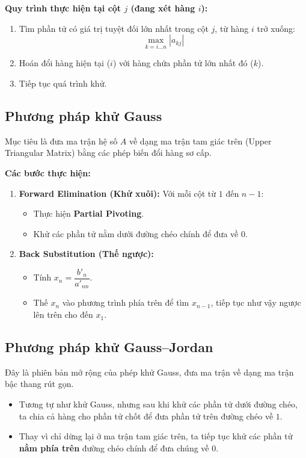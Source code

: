 \documentclass[a4paper,12pt]{report}
\begin{document}
\textbf{Quy trình thực hiện tại cột $j$ (đang xét hàng $i$):}
\begin{enumerate}
    \item Tìm phần tử có giá trị tuyệt đối lớn nhất trong cột $j$, từ hàng $i$ trở xuống:
    \[
    \max_{k=i \dots n} |a_{kj}|
    \]
    \item Hoán đổi hàng hiện tại ($i$) với hàng chứa phần tử lớn nhất đó ($k$).
    \item Tiếp tục quá trình khử.
\end{enumerate}

\subsection{Phương pháp khử Gauss}

Mục tiêu là đưa ma trận hệ số $A$ về dạng ma trận tam giác trên (Upper Triangular Matrix) bằng các phép biến đổi hàng sơ cấp.

\vspace*{0.1cm}
\textbf{Các bước thực hiện:}
\begin{enumerate}
    \item \textbf{Forward Elimination (Khử xuôi):}
    Với mỗi cột từ $1$ đến $n-1$:
    \begin{itemize}
        \item Thực hiện \textbf{Partial Pivoting}.
        \item Khử các phần tử nằm dưới đường chéo chính để đưa về $0$.
    \end{itemize}
    \item \textbf{Back Substitution (Thế ngược):}
    \begin{itemize}
        \item Tính $x_n = \dfrac{b'_n}{a'_{nn}}$.
        \item Thế $x_n$ vào phương trình phía trên để tìm $x_{n-1}$, tiếp tục như vậy ngược lên trên cho đến $x_1$.
    \end{itemize}
\end{enumerate}

\subsection{Phương pháp khử Gauss--Jordan}
Đây là phiên bản mở rộng của phép khử Gauss, đưa ma trận về dạng ma trận bậc thang rút gọn.

\begin{itemize}
    \item Tương tự như khử Gauss, nhưng sau khi khử các phần tử dưới đường chéo, ta chia cả hàng cho phần tử chốt để đưa phần tử trên đường chéo về $1$.
    
    \item Thay vì chỉ dừng lại ở ma trận tam giác trên, ta tiếp tục khử các phần tử \textbf{nằm phía trên} đường chéo chính để đưa chúng về $0$.
\end{itemize}
\end{document}

